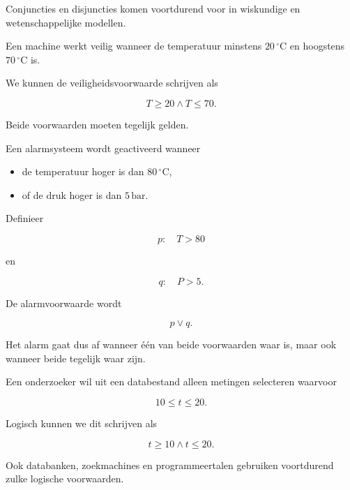 \documentclass{ximera}
\begin{document}
  Conjuncties en disjuncties komen voortdurend voor in wiskundige en
  wetenschappelijke modellen.


  \begin{voorbeeld}[Temperatuurbewaking]

  Een machine werkt veilig wanneer de temperatuur minstens
  $20\,{}^\circ\mathrm C$ en hoogstens $70\,{}^\circ\mathrm C$ is.

  We kunnen de veiligheidsvoorwaarde schrijven als

  \[
  T\geq20\land T\leq70.
  \]

  Beide voorwaarden moeten tegelijk gelden.
  \end{voorbeeld}


  \begin{voorbeeld}

  Een alarmsysteem wordt geactiveerd wanneer

  \begin{itemize}
    \item de temperatuur hoger is dan $80\,{}^\circ\mathrm C$,
    \item of de druk hoger is dan $5\,\mathrm{bar}$.
  \end{itemize}

  Definieer

  \[
  p:\quad T>80
  \]

  en

  \[
  q:\quad P>5.
  \]

  De alarmvoorwaarde wordt

  \[
  p\lor q.
  \]

  Het alarm gaat dus af wanneer één van beide voorwaarden waar is,
  maar ook wanneer beide tegelijk waar zijn.
  \end{voorbeeld}


  \begin{voorbeeld}

  Een onderzoeker wil uit een databestand alleen metingen selecteren
  waarvoor

  \[
  10\leq t\leq20.
  \]

  Logisch kunnen we dit schrijven als

  \[
  t\geq10\land t\leq20.
  \]

  Ook databanken, zoekmachines en programmeertalen gebruiken voortdurend
  zulke logische voorwaarden.
  \end{voorbeeld}


\end{document}
